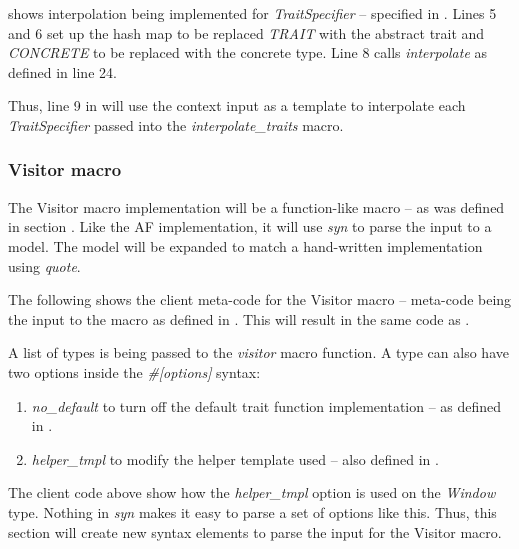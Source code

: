  shows interpolation being implemented for \textit{TraitSpecifier} -- specified in .
Lines 5 and 6 set up the hash map to be replaced \textit{TRAIT} with the abstract trait and \textit{CONCRETE} to be replaced with the concrete type.
Line 8 calls \textit{interpolate} as defined in  line 24.


Thus, line 9 in  will use the context input as a template to interpolate each \textit{TraitSpecifier} passed into the \textit{interpolate\_traits} macro.

\subsubsection{Visitor macro}
The Visitor macro implementation will be a function-like macro -- as was defined in section .
Like the AF implementation, it will use \textit{syn} to parse the input to a model.
The model will be expanded to match a hand-written implementation using \textit{quote}.

The following shows the client meta-code for the Visitor macro -- meta-code being the input to the macro as defined in .
This will result in the same code as .


A list of types is being passed to the \textit{visitor} macro function.
A type can also have two options inside the \textit{\#[options]} syntax:
\begin{enumerate}
	\item \textit{no\_default} to turn off the default trait function implementation -- as defined in .
	\item \textit{helper\_tmpl} to modify the helper template used -- also defined in .
\end{enumerate}

The client code above show how the \textit{helper\_tmpl} option is used on the \textit{Window} type.
Nothing in \textit{syn} makes it easy to parse a set of options like this.
Thus, this section will create new syntax elements to parse the input for the Visitor macro.

